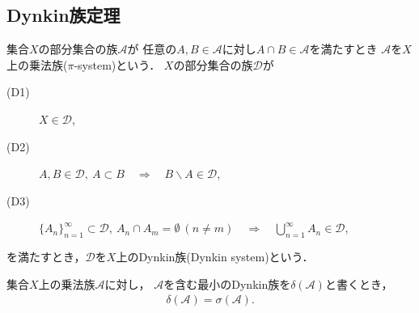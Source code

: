 \subsection{Dynkin族定理}
	\begin{screen}
		\begin{dfn}\label{def:Dynkin_system_theorem}
			集合$X$の部分集合の族$\mathscr{A}$が
			任意の$A,B \in \mathscr{A}$に対し$A \cap B \in \mathscr{A}$を満たすとき
			$\mathscr{A}$を$X$上の乗法族($\pi$-system)という．
			$X$の部分集合の族$\mathscr{D}$が
			\begin{description}
				\item[(D1)] $X \in \mathscr{D}$,
				\item[(D2)] $A,B \in \mathscr{D},
					\ A \subset B \quad \Longrightarrow \quad B \backslash A \in \mathscr{D}$,
				\item[(D3)] $\{A_n\}_{n=1}^\infty \subset \mathscr{D},
					\ A_n \cap A_m = \emptyset\ (n \neq m)
					\quad \Longrightarrow \quad \bigcup_{n=1}^\infty A_n \in \mathscr{D}$,
			\end{description}
			を満たすとき，$\mathscr{D}$を$X$上のDynkin族(Dynkin system)という．
		\end{dfn}
	\end{screen}
	
	\begin{screen}
		\begin{dfn}[Dynkin族定理]\label{thm:Dynkin_system_theorem}
			集合$X$上の乗法族$\mathscr{A}$に対し，
			$\mathscr{A}$を含む最小のDynkin族を$\delta(\mathscr{A})$と書くとき，
			\begin{align}
				\delta(\mathscr{A}) = \sigma(\mathscr{A}).
			\end{align}
		\end{dfn}
	\end{screen}
	
